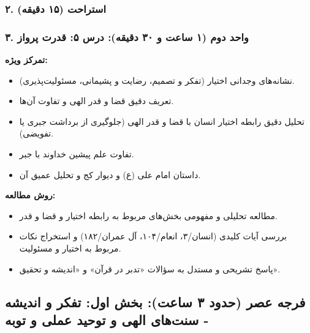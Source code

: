 \documentclass[12pt,a4paper]{article}
\begin{document}
\subsubsection*{۲. استراحت (۱۵ دقیقه)}

\subsubsection*{۳. واحد دوم (۱ ساعت و ۳۰ دقیقه): درس ۵: قدرت پرواز}
\textbf{تمرکز ویژه:}
\begin{itemize}
    \item نشانه‌های وجدانی اختیار (تفکر و تصمیم، رضایت و پشیمانی، مسئولیت‌پذیری).
    \item تعریف دقیق قضا و قدر الهی و تفاوت آن‌ها.
    \item تحلیل دقیق رابطه اختیار انسان با قضا و قدر الهی (جلوگیری از برداشت جبری یا تفویضی).
    \item تفاوت علم پیشین خداوند با جبر.
    \item داستان امام علی (ع) و دیوار کج و تحلیل عمیق آن.
\end{itemize}
\textbf{روش مطالعه:}
\begin{itemize}
    \item مطالعه تحلیلی و مفهومی بخش‌های مربوط به رابطه اختیار و قضا و قدر.
    \item بررسی آیات کلیدی (انسان/۳، انعام/۱۰۴، آل عمران/۱۸۲) و استخراج نکات مربوط به اختیار و مسئولیت.
    \item پاسخ تشریحی و مستدل به سؤالات «تدبر در قرآن» و «اندیشه و تحقیق».
\end{itemize}

\hrulefill
\subsection*{فرجه عصر (حدود ۳ ساعت): بخش اول: تفکر و اندیشه - سنت‌های الهی و توحید عملی و توبه}
\end{document}
